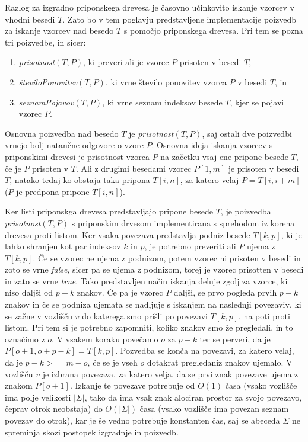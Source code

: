 Razlog za izgradno priponskega drevesa je časovno učinkovito iskanje vzorcev v vhodni besedi $T$. Zato bo v tem poglavju predstavljene implementacije poizvedb za iskanje vzorcev nad besedo $T$ s pomočjo priponskega drevesa. Pri tem se pozna tri poizvedbe, in sicer:
\begin{enumerate}
    \item \textit{prisotnost}$(T,P)$, ki preveri ali je vzorec $P$ prisoten v besedi $T$,
    \item \textit{številoPonovitev}$(T,P)$, ki vrne število ponovitev vzorca $P$ v besedi $T$, in
    \item \textit{seznamPojavov}$(T,P)$, ki vrne seznam indeksov besede $T$, kjer se pojavi vzorec $P$.
\end{enumerate}

Osnovna poizvedba nad besedo $T$ je \textit{prisotnost}$(T,P)$, saj ostali dve poizvedbi vrnejo bolj natančne odgovore o vzorc $P$. Osnovna ideja iskanja vzorcev s priponskimi drevesi je prisotnost vzorca $P$ na začetku vsaj ene pripone besede $T$, če je $P$ prisoten v $T$. Ali z drugimi besedami vzorec $P[1,m]$ je prisoten v besedi $T$, natako tedaj ko obstaja taka pripona $T[i,n]$, za katero velaj $P=T[i,i+m]$ ($P$ je predpona pripone $T[i,n]$). 

Ker listi priponskga drevesa predstavljajo pripone besede $T$, je poizvedba \textit{prisotnost}$(T,P)$ s priponskim drvesom implementirana s sprehodom iz korena drevesa proti listom. Ker vsaka povezava predstavlja podniz besede $T[k,p]$, ki je lahko shranjen kot par indeksov $k$ in $p$, je potrebno preveriti ali $P$ ujema z $T[k,p]$. Če se vzorec ne ujema z podnizom, potem vzorec ni prisoten v besedi in zoto se vrne \textit{false}, sicer pa se ujema z podnizom, torej je vzorec prisotten v besedi in zato se vrne \textit{true}. Tako predstavljen način iskanja deluje zgolj za vzorce, ki niso daljši od $p-k$ znakov. Če pa je vzorec $P$ daljši, se prvo pogleda prvih $p-k$ znakov in če se podniza ujemata se nadljuje s iskanjem na naslednji povezaviv, ki se začne v vozlišču $v$ do katerega smo prišli po povezavi $T[k,p]$, na poti proti listom. Pri tem si je potrebno zapomniti, koliko znakov smo že pregledali, in to označimo z $o$. V vsakem koraku povečamo $o$ za $p-k$ ter se perveri, da je $P[o+1,o+p-k]=T[k,p]$. Pozvedba se konča na povezavi, za katero velaj, da je $p-k>=m-o$, če se je vseh $o$ dotakrat pregledaniz znakov ujemalo. V vozlišču $v$ je izbrana povezava, za katero velja, da se prvi znak povezave ujema z znakom $P[o+1]$. Izkanje te povezave potrebuje od $O(1)$ časa (vsako vozlišče ima polje velikosti $|\Sigma|$, tako da ima vsak znak alociran prostor za svojo povezavo, čeprav otrok neobstaja) do $O(|\Sigma|)$ časa (vsako vozlišče ima povezan seznam povezav do otrok), kar je še vedno potrebuje konstanten čas, saj se abeceda $\Sigma$ ne spreminja skozi postopek izgradnje in poizvedb.

